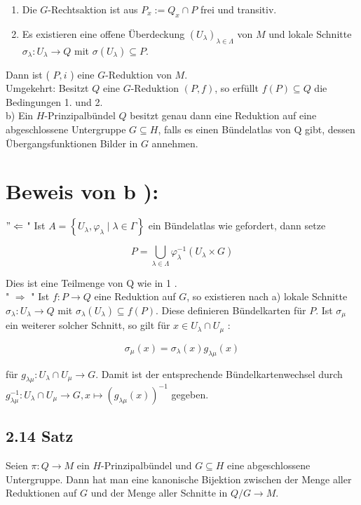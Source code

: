 \begin{enumerate}
  \item Die $G$-Rechtsaktion ist aus $P_{x}:=Q_{x} \cap P$ frei und transitiv.
  \item Es existieren eine offene Überdeckung $\left(U_{\lambda}\right)_{\lambda \in \Lambda}$ von $M$ und lokale Schnitte $\sigma_{\lambda}: U_{\lambda} \rightarrow Q$ mit $\sigma\left(U_{\lambda}\right) \subseteq P$.
\end{enumerate}

Dann ist ( $P, i$ ) eine $G$-Reduktion von $M$.\\
Umgekehrt: Besitzt $Q$ eine $G$-Reduktion $(P, f)$, so erfüllt $f(P) \subseteq Q$ die Bedingungen 1. und 2.\\
b) Ein $H$-Prinzipalbündel $Q$ besitzt genau dann eine Reduktion auf eine abgeschlossene Untergruppe $G \subseteq H$, falls es einen Bündelatlas von Q gibt, dessen Übergangsfunktionen Bilder in $G$ annehmen.

\section*{Beweis von $\mathbf{b}$ ):}
$" \Leftarrow$ " Ist $A=\left\{U_{\lambda}, \varphi_{\lambda} \mid \lambda \in \Gamma\right\}$ ein Bündelatlas wie gefordert, dann setze

$$
P=\bigcup_{\lambda \in \Lambda} \varphi_{\lambda}^{-1}\left(U_{\lambda} \times G\right)
$$

Dies ist eine Teilmenge von Q wie in 1 .\\
" $\Rightarrow$ " Ist $f: P \rightarrow Q$ eine Reduktion auf $G$, so existieren nach a) lokale Schnitte $\sigma_{\lambda}: U_{\lambda} \rightarrow Q$ mit $\sigma_{\lambda}\left(U_{\lambda}\right) \subseteq f(P)$. Diese definieren Bündelkarten für $P$. Ist $\sigma_{\mu}$ ein weiterer solcher Schnitt, so gilt für $x \in U_{\lambda} \cap U_{\mu}$ :

$$
\sigma_{\mu}(x)=\sigma_{\lambda}(x) g_{\lambda \mu}(x)
$$

für $g_{\lambda \mu}: U_{\lambda} \cap U_{\mu} \rightarrow G$. Damit ist der entsprechende Bündelkartenwechsel durch $g_{\lambda \mu}^{-1}: U_{\lambda} \cap U_{\mu} \rightarrow G, x \mapsto\left(g_{\lambda \mu}(x)\right)^{-1}$ gegeben.

\subsection*{2.14 Satz}
Seien $\pi: Q \rightarrow M$ ein $H$-Prinzipalbündel und $G \subseteq H$ eine abgeschlossene Untergruppe. Dann hat man eine kanonische Bijektion zwischen der Menge aller Reduktionen auf $G$ und der Menge aller Schnitte in $Q / G \rightarrow M$.

